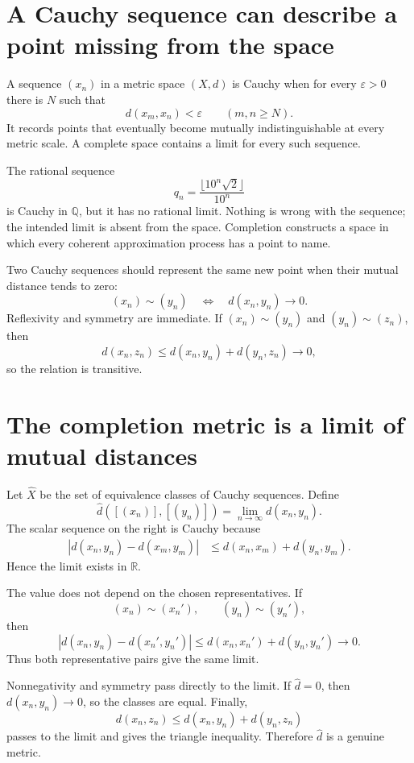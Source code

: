
\section{A Cauchy sequence can describe a point missing from the space}

A sequence \((x_n)\) in a metric space \((X,d)\) is Cauchy when for every \(\varepsilon>0\) there is \(N\) such that
\[
  d(x_m,x_n)<\varepsilon
  \qquad(m,n\ge N).
\]
It records points that eventually become mutually indistinguishable at every metric scale.  A complete space contains a limit for every such sequence.

The rational sequence
\[
  q_n=\frac{\lfloor10^n\sqrt2\rfloor}{10^n}
\]
is Cauchy in \(\mathbb Q\), but it has no rational limit.  Nothing is wrong with the sequence; the intended limit is absent from the space.  Completion constructs a space in which every coherent approximation process has a point to name.

Two Cauchy sequences should represent the same new point when their mutual distance tends to zero:
\[
  (x_n)\sim(y_n)
  \quad\Longleftrightarrow\quad
  d(x_n,y_n)\longrightarrow0.
\]
Reflexivity and symmetry are immediate.  If \((x_n)\sim(y_n)\) and \((y_n)\sim(z_n)\), then
\[
  d(x_n,z_n)
  \le d(x_n,y_n)+d(y_n,z_n)\longrightarrow0,
\]
so the relation is transitive.

\section{The completion metric is a limit of mutual distances}

Let \(\widehat X\) be the set of equivalence classes of Cauchy sequences.  Define
\[
  \widehat d([(x_n)],[(y_n)])
  =\lim_{n\to\infty}d(x_n,y_n).
\]
The scalar sequence on the right is Cauchy because
\[
\begin{aligned}
  |d(x_n,y_n)-d(x_m,y_m)|
  &\le d(x_n,x_m)+d(y_n,y_m).
\end{aligned}
\]
Hence the limit exists in \(\mathbb R\).

The value does not depend on the chosen representatives.  If
\[
  (x_n)\sim(x_n'),
  \qquad
  (y_n)\sim(y_n'),
\]
then
\[
  |d(x_n,y_n)-d(x_n',y_n')|
  \le d(x_n,x_n')+d(y_n,y_n')\longrightarrow0.
\]
Thus both representative pairs give the same limit.

Nonnegativity and symmetry pass directly to the limit.  If \(\widehat d=0\), then \(d(x_n,y_n)\to0\), so the classes are equal.  Finally,
\[
  d(x_n,z_n)
  \le d(x_n,y_n)+d(y_n,z_n)
\]
passes to the limit and gives the triangle inequality.  Therefore \(\widehat d\) is a genuine metric.

